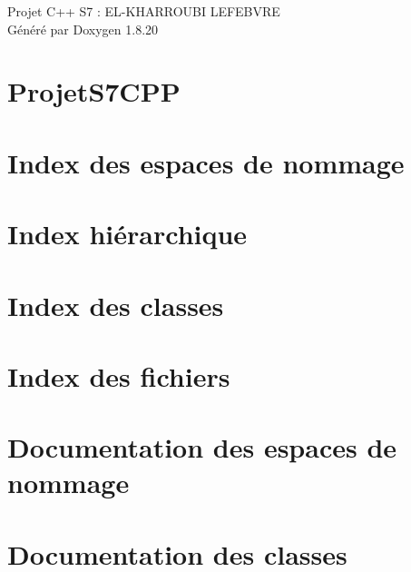 \let\mypdfximage\pdfximage\def\pdfximage{\immediate\mypdfximage}\documentclass[twoside]{book}
\newcommand{\+}{\discretionary{\mbox{\scriptsize$\hookleftarrow$}}{}{}}
\newcommand{\clearemptydoublepage}{%
  \newpage{\pagestyle{empty}\cleardoublepage}%
}
\begin{document}
\hypersetup{pageanchor=false,
             bookmarksnumbered=true,
             pdfencoding=unicode
            }
\begin{titlepage}
\vspace*{7cm}
\begin{center}%
{\Large Projet C++ S7 \+: E\+L-\/\+K\+H\+A\+R\+R\+O\+U\+BI L\+E\+F\+E\+B\+V\+RE }\\
\vspace*{1cm}
{\large Généré par Doxygen 1.8.20}\\
\end{center}
\end{titlepage}
\clearemptydoublepage
{}
\tableofcontents
\clearemptydoublepage
{}
\hypersetup{pageanchor=true}

\chapter{Projet\+S7\+C\+PP}
\label{index}\hypertarget{index}{}
\chapter{Index des espaces de nommage}

\chapter{Index hiérarchique}

\chapter{Index des classes}

\chapter{Index des fichiers}

\chapter{Documentation des espaces de nommage}



\chapter{Documentation des classes}































\end{document}
